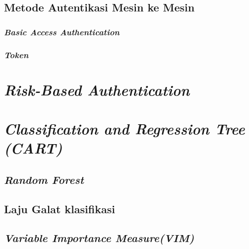 \documentclass[ugmtesis]{ugmtesis}
\begin{document}
		\subsection{Metode Autentikasi Mesin ke Mesin}
		\label{metode autentikasi mesin ke mesin}
		

			\subsubsection{\textit{Basic Access Authentication}}
			\label{basic access authentication}
			

			\subsubsection{\textit{Token}}
			\label{token}
			

	\section{\textit{Risk-Based Authentication}}
	\label{risk-based authentication}
	

	\section{\textit{Classification and Regression Tree (CART)}}
	\label{classification and regression tree}
	

		\subsection{\textit{Random Forest}}
		\label{random forest}
		

		\subsection{Laju Galat klasifikasi}
		\label{laju galat klasifikasi}
		

		\subsection{\textit{Variable Importance Measure(VIM)}}
		\label{variable importance measure}
		
\end{document}

